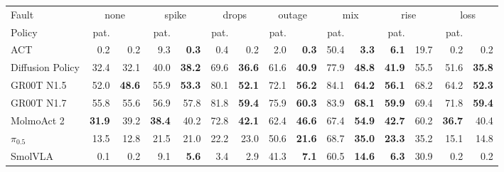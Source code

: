 \begin{tabular}{l rrrrrrrrrrrrrr}
\toprule
Fault & \multicolumn{2}{c}{none} & \multicolumn{2}{c}{spike} & \multicolumn{2}{c}{drops} & \multicolumn{2}{c}{outage} & \multicolumn{2}{c}{mix} & \multicolumn{2}{c}{rise} & \multicolumn{2}{c}{loss} \\
\cmidrule(lr){2-3}\cmidrule(lr){4-5}\cmidrule(lr){6-7}\cmidrule(lr){8-9}\cmidrule(lr){10-11}\cmidrule(lr){12-13}\cmidrule(lr){14-15}
Policy & pat. & \drtc{} & pat. & \drtc{} & pat. & \drtc{} & pat. & \drtc{} & pat. & \drtc{} & pat. & \drtc{} & pat. & \drtc{} \\
\midrule
ACT & 0.2 & 0.2 & 9.3 & \textbf{0.3} & 0.4 & 0.2 & 2.0 & \textbf{0.3} & 50.4 & \textbf{3.3} & \textbf{6.1} & 19.7 & 0.2 & 0.2 \\
Diffusion Policy & 32.4 & 32.1 & 40.0 & \textbf{38.2} & 69.6 & \textbf{36.6} & 61.6 & \textbf{40.9} & 77.9 & \textbf{48.8} & \textbf{41.9} & 55.5 & 51.6 & \textbf{35.8} \\
GR00T N1.5 & 52.0 & \textbf{48.6} & 55.9 & \textbf{53.3} & 80.1 & \textbf{52.1} & 72.1 & \textbf{56.2} & 84.1 & \textbf{64.2} & \textbf{56.1} & 68.2 & 64.2 & \textbf{52.3} \\
GR00T N1.7 & 55.8 & 55.6 & 56.9 & 57.8 & 81.8 & \textbf{59.4} & 75.9 & \textbf{60.3} & 83.9 & \textbf{68.1} & \textbf{59.9} & 69.4 & 71.8 & \textbf{59.4} \\
MolmoAct 2 & \textbf{31.9} & 39.2 & \textbf{38.4} & 40.2 & 72.8 & \textbf{42.1} & 62.4 & \textbf{46.6} & 67.4 & \textbf{54.9} & \textbf{42.7} & 60.2 & \textbf{36.7} & 40.4 \\
$\pi_{0.5}$ & 13.5 & 12.8 & 21.5 & 21.0 & 22.2 & 23.0 & 50.6 & \textbf{21.6} & 68.7 & \textbf{35.0} & \textbf{23.3} & 35.2 & 15.1 & 14.8 \\
SmolVLA & 0.1 & 0.2 & 9.1 & \textbf{5.6} & 3.4 & 2.9 & 41.3 & \textbf{7.1} & 60.5 & \textbf{14.6} & \textbf{6.3} & 30.9 & 0.2 & 0.2 \\
\bottomrule
\end{tabular}
